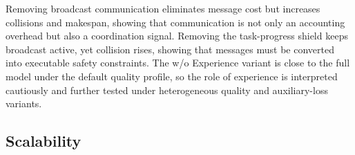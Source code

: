 \documentclass[preprint,12pt]{elsarticle}
\begin{document}
\begin{table}[htbp]
\centering
\caption{Component ablation of CCT-MARL.}
\label{tab:ablation}
\end{table}

Removing broadcast communication eliminates message cost but increases collisions and makespan, showing that communication is not only an accounting overhead but also a coordination signal. Removing the task-progress shield keeps broadcast active, yet collision rises, showing that messages must be converted into executable safety constraints. The w/o Experience variant is close to the full model under the default quality profile, so the role of experience is interpreted cautiously and further tested under heterogeneous quality and auxiliary-loss variants.

\subsection{Scalability}
\end{document}
